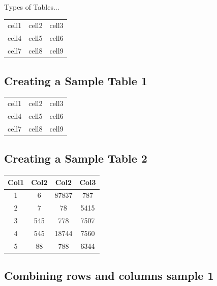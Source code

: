 \documentclass{article}
\begin{document}
	Types of Tables...

\begin{center}
	\begin{tabular}{c c c}
		cell1 & cell2 & cell3 \\ 
		cell4 & cell5 & cell6 \\  
		cell7 & cell8 & cell9    
	\end{tabular}
\end{center}

   \subsection*{Creating a Sample Table 1}

\begin{center}
	\begin{tabular}{|c|c|c|}
		cell1 & cell2 & cell3 \\ 
		cell4 & cell5 & cell6 \\  
		cell7 & cell8 & cell9    
	\end{tabular}
	
\end{center}

   \subsection*{Creating a Sample Table 2}
  
  \begin{center}
  	\begin{tabular}{||c c c c||} 
  		\hline
  		Col1 & Col2 & Col2 & Col3 \\ [0.5ex] 
  		\hline\hline
  		1 & 6 & 87837 & 787 \\ 
  		\hline
  		2 & 7 & 78 & 5415 \\
  		\hline
  		3 & 545 & 778 & 7507 \\
  		\hline
  		4 & 545 & 18744 & 7560 \\
  		\hline
  		5 & 88 & 788 & 6344 \\ [1ex] 
  		\hline
  	\end{tabular}
  \end{center}
  
  \subsection*{Combining rows and columns sample 1}
  
\end{document}
